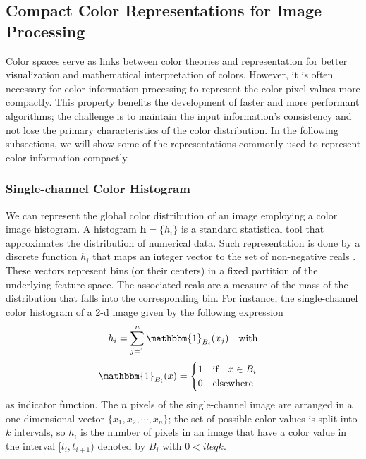 \subsection{Compact Color Representations for Image Processing}

Color spaces serve as links between color theories and representation for better visualization and mathematical interpretation of colors. However, it is often necessary for color information processing to represent the color pixel values more compactly. This property benefits the development of faster and more performant algorithms; the challenge is to maintain the input information's consistency and not lose the primary characteristics of the color distribution. In the following subsections, we will show some of the representations commonly used to represent color information compactly.

\subsubsection{Single-channel Color Histogram}
We can represent the global color distribution of an image employing a color image histogram. A histogram $\mathbf{h}= \{h_i\}$ is a standard statistical tool that approximates the distribution of numerical data. Such representation is done by a discrete function $h_i$ that maps an integer vector to the set of non-negative reals \citep{Scott:Book:2008}. These vectors represent bins (or their centers) in a fixed partition of the underlying feature space. The associated reals are a measure of the mass of the distribution that falls into the corresponding bin. For instance, the single-channel color histogram of a 2-d image given by the following expression
\begin{equation}\label{eq:single_channel_histogram}
    h_i = \sum_{j=1}^{n}  \mathbbm{1}_{B_i}(x_j) \quad \textrm{with} 
\end{equation}
\begin{equation}\nonumber
    \mathbbm{1}_{B_i}(x) = 
    \begin{cases} 
      1 \quad \textrm{if} \quad x \in B_i \\
      0 \quad \textrm{elsewhere}        
   	 \end{cases} 
\end{equation}
as indicator function. The $n$ pixels of the single-channel image are arranged in a one-dimensional vector $\{x_1, x_2, \cdots, x_n\}$; the set of possible color values is split into $k$ intervals, so $h_i$ is the number of pixels in an image that have a color value in the interval $[t_i, t_{i+1})$ denoted by $B_i$ with $0 < i leq k$.

